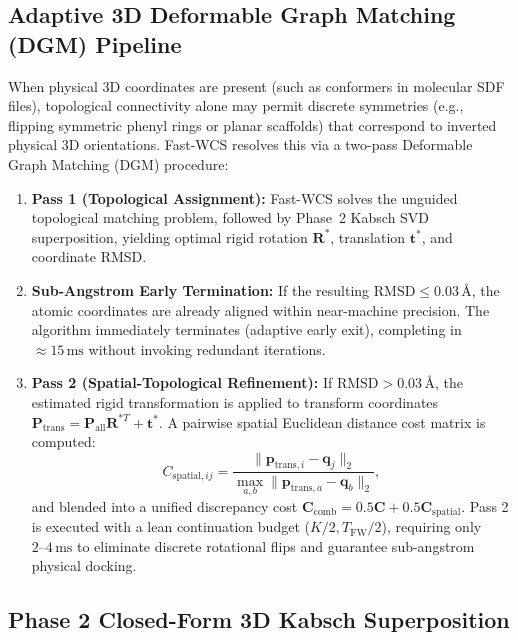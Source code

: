 \documentclass[conference]{IEEEtran}
\begin{document}
\subsection{Adaptive 3D Deformable Graph Matching (DGM) Pipeline}
\label{subsec:dgm}

When physical 3D coordinates are present (such as conformers in molecular SDF files), topological connectivity alone may permit discrete symmetries (e.g., flipping symmetric phenyl rings or planar scaffolds) that correspond to inverted physical 3D orientations. Fast-WCS resolves this via a two-pass Deformable Graph Matching (DGM) procedure:
\begin{enumerate}
    \item \textbf{Pass 1 (Topological Assignment):} Fast-WCS solves the unguided topological matching problem, followed by Phase~2 Kabsch SVD superposition, yielding optimal rigid rotation $\mathbf{R}^*$, translation $\mathbf{t}^*$, and coordinate RMSD.
    \item \textbf{Sub-Angstrom Early Termination:} If the resulting $\text{RMSD} \leq 0.03\,\text{\AA}$, the atomic coordinates are already aligned within near-machine precision. The algorithm immediately terminates (adaptive early exit), completing in $\approx 15\,\text{ms}$ without invoking redundant iterations.
    \item \textbf{Pass 2 (Spatial-Topological Refinement):} If $\text{RMSD} > 0.03\,\text{\AA}$, the estimated rigid transformation is applied to transform coordinates $\mathbf{P}_{\text{trans}} = \mathbf{P}_{\text{all}}\mathbf{R}^{*T} + \mathbf{t}^*$. A pairwise spatial Euclidean distance cost matrix is computed:
    \begin{equation}
    C_{\text{spatial}, ij} = \frac{\|\mathbf{p}_{\text{trans}, i} - \mathbf{q}_j\|_2}{\max_{a, b} \|\mathbf{p}_{\text{trans}, a} - \mathbf{q}_b\|_2},
    \end{equation}
    and blended into a unified discrepancy cost $\mathbf{C}_{\text{comb}} = 0.5 \mathbf{C} + 0.5 \mathbf{C}_{\text{spatial}}$. Pass 2 is executed with a lean continuation budget ($K/2, T_{\text{FW}}/2$), requiring only $2\text{--}4\,\text{ms}$ to eliminate discrete rotational flips and guarantee sub-angstrom physical docking.
\end{enumerate}

\subsection{Phase 2 Closed-Form 3D Kabsch Superposition}
\end{document}
